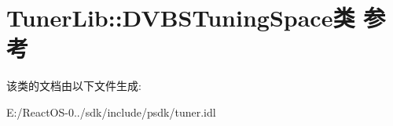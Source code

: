 \hypertarget{class_tuner_lib_1_1_d_v_b_s_tuning_space}{}\section{Tuner\+Lib\+:\+:D\+V\+B\+S\+Tuning\+Space类 参考}
\label{class_tuner_lib_1_1_d_v_b_s_tuning_space}


该类的文档由以下文件生成\+:\begin{DoxyCompactItemize}
\item 
E\+:/\+React\+O\+S-\/0../sdk/include/psdk/tuner.\+idl\end{DoxyCompactItemize}
